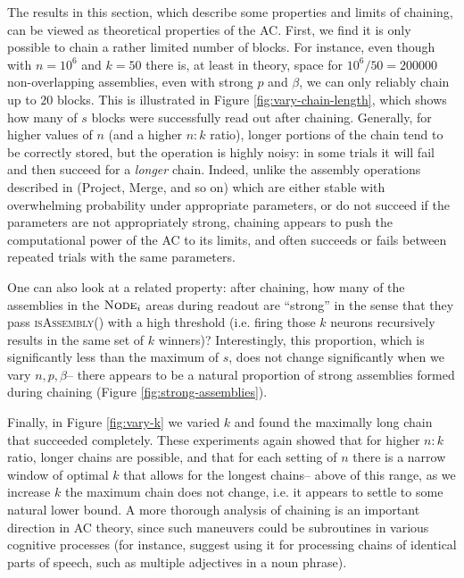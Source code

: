 \documentclass[letterpaper]{article}
\newcommand{\workzone}[1]{\mbox{\textsc{Node}$_{#1}$}\xspace}
\begin{document}
The results in this section, which describe some properties and limits of chaining, can be viewed as theoretical properties of the AC. First, we find it is only possible to chain a rather limited number of blocks. For instance, even though with $n=10^6$ and $k=50$ there is, at least in theory, space for $10^6/50 = 200000$ non-overlapping assemblies, even with strong $p$ and $\beta$, we can only reliably chain up to $20$ blocks. This is illustrated in Figure \ref{fig:vary-chain-length}, which shows how many of $s$ blocks were successfully read out after chaining. Generally, for higher values of $n$ (and a higher $n:k$ ratio), longer portions of the chain tend to be correctly stored, but the operation is highly noisy: in some trials it will fail and then succeed for a {\em longer} chain. Indeed, unlike the assembly operations described in \cite{papadimitriou2020} (Project, Merge, and so on) which are either stable with overwhelming probability under appropriate parameters, or do not succeed if the parameters are not appropriately strong, chaining appears to push the computational power of the AC to its limits, and often succeeds or fails between repeated trials with the same parameters. 

One can also look at a related property: after chaining, how many of the assemblies in the $\workzone{i}$ areas during readout are ``strong'' in the sense that they pass \textsc{isAssembly()} with a high threshold (i.e. firing those $k$ neurons recursively results in the same set of $k$ winners)? Interestingly, this proportion, which is significantly less than the maximum of $s$, does not change significantly when we vary $n,p,\beta$-- there appears to be a natural proportion of strong assemblies formed during chaining (Figure \ref{fig:strong-assemblies}). 

Finally, in Figure \ref{fig:vary-k} we varied $k$ and found the maximally long chain that succeeded completely. These experiments again showed that for higher $n:k$ ratio, longer chains are possible, and that for each setting of $n$ there is a narrow window of optimal $k$ that allows for the longest chains-- above of this range, as we increase $k$ the maximum chain does not change, i.e. it appears to settle to some natural lower bound. A more thorough analysis of chaining is an important direction in AC theory, since such maneuvers could be subroutines in various cognitive processes (for instance, \cite{mitropolsky_biologically_2021} suggest using it for processing chains of identical parts of speech, such as multiple adjectives in a noun phrase). 
\end{document}
